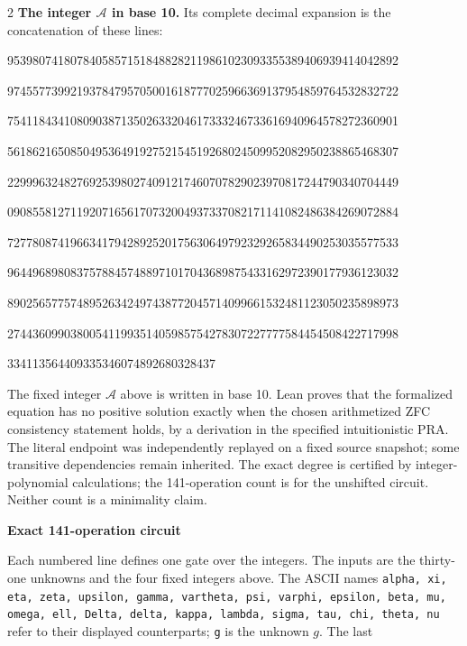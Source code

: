 \documentclass[10pt]{article}
\begin{document}
\begin{multicols}{2}
\textbf{The integer $\mathcal A$ in base 10.}
Its complete decimal expansion is the concatenation of these lines:\par
\begingroup\fontsize{7.7}{8.2}\selectfont{}\par
95398074180784058571518488282119861023093355389406939414042892\par
97455773992193784795705001618777025966369137954859764532832722\par
75411843410809038713502633204617333246733616940964578272360901\par
56186216508504953649192752154519268024509952082950238865468307\par
22999632482769253980274091217460707829023970817244790340704449\par
09085581271192071656170732004937337082171141082486384269072884\par
72778087419663417942892520175630649792329265834490253035577533\par
96449689808375788457488971017043689875433162972390177936123032\par
89025657757489526342497438772045714099661532481123050235898973\par
27443609903800541199351405985754278307227777584454508422717998\par
334113564409335346074892680328437\par
\endgroup
\normalfont\fontsize{7.7}{8.2}\selectfont
The fixed integer $\mathcal A$ above is written in base 10. Lean proves that the formalized equation has no positive solution exactly
when the chosen arithmetized ZFC consistency statement holds, by a derivation
in the specified intuitionistic PRA. The literal endpoint was independently
replayed on a fixed source snapshot; some transitive dependencies remain
inherited. The exact degree is certified by integer-polynomial calculations;
the 141-operation count is for the unshifted circuit. Neither count is a
minimality claim.
\end{multicols}
\clearpage
\begin{center}{\large\bfseries Exact 141-operation circuit}\end{center}
Each numbered line defines one gate over the integers. The inputs are the
thirty-one unknowns and the four fixed integers above. The ASCII names
\texttt{alpha, xi, eta, zeta, upsilon, gamma, vartheta, psi, varphi, epsilon, beta, mu, omega, ell, Delta, delta, kappa, lambda, sigma, tau, chi, theta, nu}
refer to their displayed counterparts; \texttt{g} is the unknown $g$. The last
\end{document}

